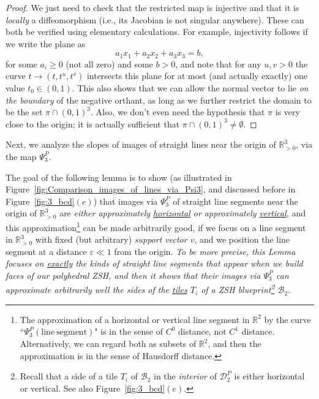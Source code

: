 \documentclass[12pt,letterpaper]{article}
\newcommand{\B}{\mathcal{B}}
\newcommand{\D}{\mathcal{D}}
\newcommand{\RR}{\mathbb{R}}
\newcommand{\RRp}{\mathbb{R}_{>0}}
\newcommand{\eps}{\varepsilon}
\begin{document}
\begin{proof}
We just need to check that the restricted map is injective and that it is {\em locally} a diffeomorphism (i.e., its Jacobian is not singular anywhere). These can both be verified using elementary calculations. For example, injectivity follows if we write the plane as 
$$
a_1x_1 + a_2x_2 + a_3x_3 = b,
$$
for some $a_i \ge 0$ (not all zero) and some $b > 0$, and note that for any $u,v>0$ the curve $t \to (t, t^u, t^v)$ intersects this plane for at most (and actually exactly) one value $t_0 \in (0,1)$. This also shows that we can allow the normal vector to lie {\em on the boundary} of the negative orthant, as long as we further restrict the domain to be the set $\pi \cap (0,1)^3$. Also, we don't even need the hypothesis that $\pi$ is very close to the origin; it is actually  sufficient that $\pi \cap (0,1)^3 \neq \emptyset$.
\end{proof}




\bigskip

\bigskip


\noindent
Next, we analyze the slopes of images of straight lines near the origin of $\RRp^3$, via the map $\Psi_3^P$.

The goal of the following lemma is to show (as illustrated in Figure~\ref{fig:Comparison_images_of_lines_via_Psi3}, and discussed before in Figure~\ref{fig:3_bcd}$(e)$) that  images via $\Psi_3^P$ of straight line segments near the origin of $\RRp^3$ are {\em either approximately \ul{horizontal} or approximately \ul{vertical},} and this approximation\footnote{The approximation of a horizontal or vertical line segment in $\RR^2$ by the curve ``$\Psi_3^P(\mathrm{line \ segment})$" is in the sense of $C^0$ distance, not $C^1$ distance. Alternatively, we can regard both as subsets of $\RR^2$, and then the approximation is in the sense of Hausdorff distance.} can be made arbitrarily good, if we focus on a line segment in $\RRp^3$ with fixed (but arbitrary) {\em support vector $v$}, and we position the line segment at a distance $\eps \ll 1$ from the origin. {\em To be more precise, this Lemma focuses on \ul{\em exactly} the kinds of straight line segments  that appear when we build faces of our polyhedral ZSH, and then it shows that their images via $\Psi_3^P$ can approximate arbitrarily well the sides of the \ul{\em tiles} $T_i$ of a ZSH blueprint\footnote{Recall that a side of a tile $T_i$ of $\B_2$ in the {\em interior} of $\D_2^P$ is either horizontal or vertical. See also Figure~\ref{fig:3_bcd}$(e)$.} $\B_2$.} 
\end{document}
